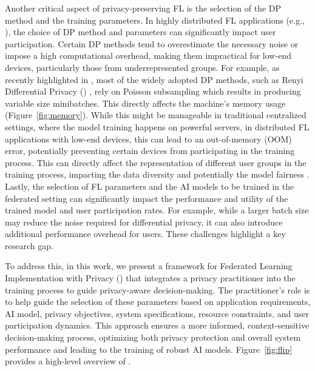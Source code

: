 Another critical aspect of privacy-preserving FL is the selection of the DP method and the training parameters.
%
In highly distributed FL applications (e.g., \cite{yang2018applied}), the choice of DP method and parameters can significantly impact user participation. 
%
%
Certain DP methods tend to overestimate the necessary noise or impose a high computational overhead, making them impractical for low-end devices, particularly those from underrepresented groups. 
%
For example, as recently highlighted in \cite{birrell2024differentially}, most of the widely adopted DP methods, such as Renyi Differential Privacy (\rdp) \cite{mironov2017renyi}, rely on Poisson subsampling which results in producing variable size minibatches. 
%
This directly affects the machine's memory usage (Figure~\ref{fig:memory}).
%
While this might be manageable in traditional centralized settings, where the model training happens on powerful servers, in distributed FL applications with low-end devices, this can lead to an out-of-memory (OOM) error, potentially preventing certain devices from participating in the training process. 
%
This can directly affect the representation of different user groups in the training process, impacting the data diversity and potentially the model fairness \cite{fu2023client,xiao2021vehicle}. 
% 
Lastly, the selection of FL parameters and the AI models to be trained in the federated setting can significantly impact the performance and utility of the trained model and user participation rates. 
%
For example, while a larger batch size may reduce the noise required for differential privacy, it can also introduce additional performance overhead for users. 
%
These challenges highlight a key research gap.
%

To address this, in this work, we present a framework for Federated Learning Implementation with Privacy (\oursys) that integrates a privacy practitioner into the training process to guide privacy-aware decision-making.
%
The practitioner's role is to help guide the selection of these parameters based on application requirements, AI model, privacy objectives, system specifications, resource constraints, and user participation dynamics. 
%
This approach ensures a more informed, context-sensitive decision-making process, optimizing both privacy protection and overall system performance and leading to the training of robust AI models.
%
Figure~\ref{fig:flip} provides a high-level overview of \oursys.
%
%

